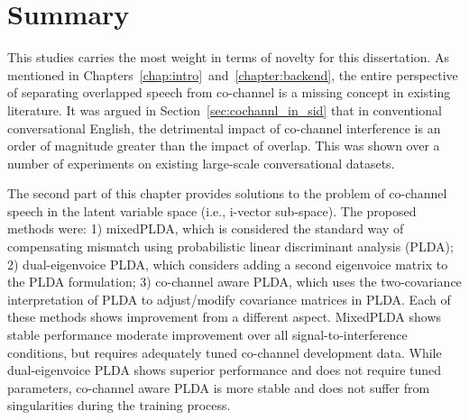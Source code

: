\section{Summary}
\label{sec:ch3_summary}
This studies carries the most weight in terms of novelty for this dissertation. 
As mentioned in Chapters~\ref{chap:intro}~and~\ref{chapter:backend}, the entire perspective of separating overlapped speech from co-channel is a missing concept in existing literature. 
It was argued in Section~\ref{sec:cochannl_in_sid} that in conventional conversational English, the detrimental impact of co-channel interference is an order of magnitude greater than the impact of overlap. 
This was shown over a number of experiments on existing large-scale conversational datasets. 

The second part of this chapter provides solutions to the problem of co-channel speech in the latent variable space (i.e., i-vector sub-space). 
The proposed methods were: 1) mixedPLDA, which is considered the standard way of compensating mismatch using probabilistic linear discriminant analysis (PLDA); 2) dual-eigenvoice PLDA, which considers adding a second eigenvoice matrix to the PLDA formulation; 3) co-channel aware PLDA, which uses the two-covariance interpretation of PLDA to adjust/modify covariance matrices in PLDA. 
Each of these methods shows improvement from a different aspect. 
MixedPLDA shows stable performance moderate improvement over all signal-to-interference conditions, but requires adequately tuned co-channel development data. 
While dual-eigenvoice PLDA shows superior performance and does not require tuned parameters, co-channel aware PLDA is more stable and does not suffer from singularities during the training process. 


